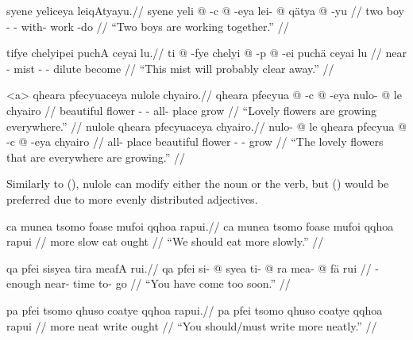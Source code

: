 \documentclass{article}
\begin{document}
\ex[lingstyle=QuCheanya] \begingl
\glpreamble syene yeliceya leiqAtyayu.//
\gla syene yeli @ -c @ -eya lei- @ q\"atya @ -yu //
\glb two boy - - with- work -do //
\glft ``Two boys are working together.'' //
\endgl \xe

\ex[lingstyle=QuCheanya] \begingl
\glpreamble tifye chelyipei puchA ceyai lu.//
\gla ti @ -fye chelyi @ -p @ -ei puch\"a ceyai lu //
\glb near - mist - - dilute become  //
\glft ``This mist will probably clear away.'' //
\endgl \xe

\pex[lingstyle=QuCheanya,tag=flowers] 
\a<a> \begingl
\glpreamble qheara pfecyuaceya nulole chyairo.//
\gla qheara pfecyua @ -c @ -eya nulo- @ le chyairo //
\glb beautiful flower - - all- place grow //
\glft ``Lovely flowers are growing everywhere.'' //
\endgl
\a \begingl
\glpreamble nulole qheara pfecyuaceya chyairo.//
\gla nulo- @ le qheara pfecyua @ -c @ -eya chyairo //
\glb all- place beautiful flower - - grow //
\glft ``The lovely flowers that are everywhere are growing.'' //
\endgl
\xe

Similarly to (), {\quch nulole} can modify either the noun or the verb, but () would be preferred due to more evenly distributed adjectives.

\ex[lingstyle=QuCheanya] \begingl
\glpreamble ca munea tsomo foase mufoi qqhoa rapui.//
\gla ca munea tsomo foase mufoi qqhoa rapui //
\glb {}  more slow eat  ought //
\glft ``We should eat more slowly.'' //
\endgl \xe

\ex[lingstyle=QuCheanya] \begingl
\glpreamble qa pfei sisyea tira meafA rui.//
\gla qa pfei si- @ syea ti- @ ra mea- @ f\"a rui //
\glb {}  - enough near- time to- go  //
\glft ``You have come too soon.'' //
\endgl \xe

\ex[lingstyle=QuCheanya] \begingl
\glpreamble pa pfei tsomo qhuso coatye qqhoa rapui.//
\gla pa pfei tsomo qhuso coatye qqhoa rapui //
\glb {}  more neat write  ought //
\glft ``You should/must write more neatly.'' //
\endgl \xe
\end{document}
